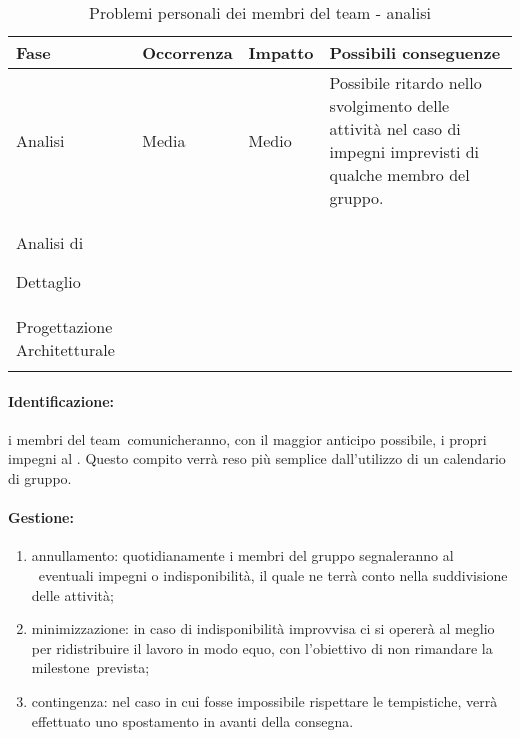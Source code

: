 \documentclass[../PianoProgetto.tex]{subfiles}
\begin{document}
	
	\begin{table}[h]
		\centering
		\begin{tabularx}{\textwidth}{F O O P}
			\toprule
			\textbf{Fase} & \textbf{Occorrenza} & \textbf{Impatto} & \textbf{Possibili conseguenze}\\
			\midrule
			Analisi & Media & Medio & Possibile ritardo nello svolgimento delle attività nel caso di impegni imprevisti di qualche membro del gruppo. \\
			\midrule
			Analisi di \par Dettaglio & & & \\
			\midrule
			Progettazione Architetturale & & & \\
			\bottomrule
		\end{tabularx}
		\caption{Problemi personali dei membri del team - analisi}
		\label{tab:Problemi personali dei membri del team - analisi}	
	\end{table}
		
	\paragraph*{Identificazione:} i membri del team\g\ comunicheranno, con il maggior anticipo possibile, i propri impegni al \responsabilediprogetto . Questo compito verrà reso più semplice dall'utilizzo di un calendario di gruppo. 
	
	\paragraph*{Gestione:}
	\begin{enumerate}
		\item annullamento: quotidianamente i membri del gruppo segnaleranno al \responsabilediprogetto\ eventuali impegni o indisponibilità, il quale ne terrà conto nella suddivisione delle attività;
		\item minimizzazione: in caso di indisponibilità improvvisa ci si opererà al meglio per ridistribuire il lavoro in modo equo, con l'obiettivo di non rimandare la milestone\g\ prevista;
		\item contingenza: nel caso in cui fosse impossibile rispettare le tempistiche, verrà effettuato uno spostamento in avanti della consegna.
	\end{enumerate}
			
\end{document}
